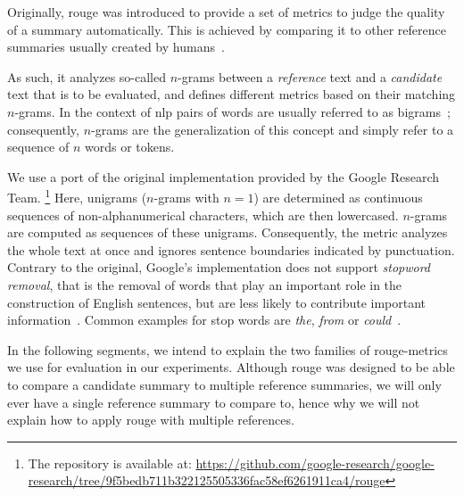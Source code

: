Originally, \ac{rouge} was introduced to provide a set of metrics to judge the quality of a summary automatically.
This is achieved by comparing it to other reference summaries usually created by humans~\parencite[74]{rouge}.

As such, it analyzes so-called \(n\)-grams between
a \emph{reference} text and a \emph{candidate} text that is to be evaluated,
and defines different metrics based on their matching \(n\)-grams.
In the context of \acl{nlp} pairs of words are usually referred to as bigrams~\parencite[30-31]{statistical_nlp};
consequently, \(n\)-grams are the generalization of this concept and simply refer to a sequence of \(n\) words or tokens.

We use a port of the original implementation provided by the Google Research Team.%
\footnote{The repository is available at: \url{https://github.com/google-research/google-research/tree/9f5bedb711b322125505336fac58ef6261911ca4/rouge}}
Here, unigrams (\(n\)-grams with \(n = 1\)) are determined as continuous sequences of non-alphanumerical characters,
which are then lowercased.
\(n\)-grams are computed as sequences of these unigrams.
Consequently, the metric analyzes the whole text at once and ignores sentence boundaries indicated by punctuation.
Contrary to the original, Google's implementation does not support \emph{stopword removal},
that is the removal of words that play an important role in the construction of English sentences,
but are less likely to contribute important information~\parencite[533-534]{statistical_nlp}.
Common examples for stop words are \emph{the}, \emph{from} or \emph{could}~\parencite[533]{statistical_nlp}.

In the following segments, we intend to explain the two families of \acs*{rouge}-metrics
we use for evaluation in our experiments.
Although \acs*{rouge} was designed to be able to compare a candidate summary to multiple reference summaries,
we will only ever have a single reference summary to compare to,
hence why we will not explain how to apply \acs*{rouge} with multiple references.

